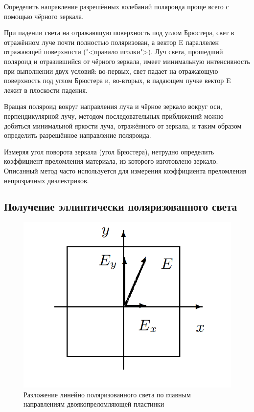 \documentclass[a4paper,12pt]{article}
\begin{document}
	Определить направление разрешённых колебаний поляроида проще всего с помощью чёрного зеркала.
	
При падении света на отражающую поверхность под углом Брюстера, свет в отражённом луче почти полностью поляризован, а вектор E
параллелен отражающей поверхности ("<правило иголки">). Луч света,
прошедший поляроид и отразившийся от чёрного зеркала, имеет минимальную интенсивность при выполнении двух условий: во-первых, свет
падает на отражающую поверхность под углом Брюстера и, во-вторых,
в падающем пучке вектор E лежит в плоскости падения.

Вращая поляроид вокруг направления луча и чёрное зеркало вокруг
оси, перпендикулярной лучу, методом последовательных приближений
можно добиться минимальной яркости луча, отражённого от зеркала,
и таким образом определить разрешённое направление поляроида.

Измеряя угол поворота зеркала (угол Брюстера), нетрудно определить коэффициент преломления материала, из которого изготовлено
зеркало. Описанный метод часто используется для измерения коэффициента преломления непрозрачных диэлектриков.

\subsection{Получение эллиптически поляризованного света}


\begin{figure}[h!]
    \centering
    \includegraphics[scale = 0.4]{1 (1).png}
    \caption{Разложение линейно поляризованного света по главным направлениям двоякопреломляющей пластинки }
    \label{fig : 1}
\end{figure}
\end{document}

